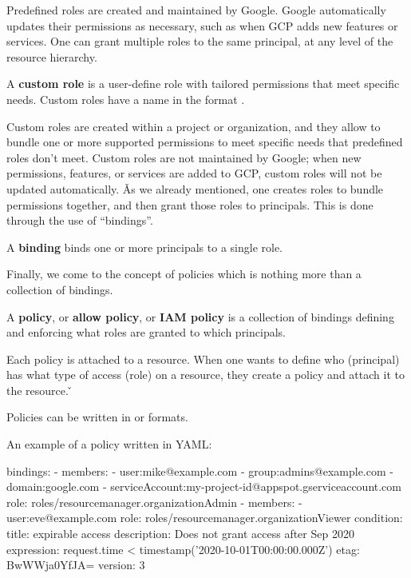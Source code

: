Predefined roles are created and maintained by Google. Google automatically updates their permissions as necessary,
such as when GCP adds new features or services. One can grant multiple roles to the same principal, at any level
of the resource hierarchy.

A \textbf{custom role} is a user-define role with tailored permissions that meet specific needs. Custom roles have a
name in the format .
\ed

Custom roles are created within a project or organization, and they allow to bundle one or more supported permissions
to meet specific needs that predefined roles don't meet. Custom roles are not maintained by Google; when new
permissions,
features, or services are added to GCP, custom roles will not be updated automatically. \v

As we already mentioned, one creates roles to bundle permissions together, and then grant those roles to principals.
This is done through the use of ``bindings''.

\bd[Binding]
A \textbf{binding} binds one or more principals to a single role.
\ed

Finally, we come to the concept of policies which is nothing more than a collection of bindings.

A \textbf{policy}, or \textbf{allow policy}, or \textbf{IAM policy} is a collection of bindings defining and enforcing
what roles are granted to which principals.
\ed

Each policy is attached to a resource. When one wants to define who (principal) has what type of access (role) on a
resource, they create a policy and attach it to the resource. \v


Policies can be written in  or  formats.

\be
An example of a policy written in YAML:
\begin{block}
bindings:
- members:
  - user:mike@example.com
  - group:admins@example.com
  - domain:google.com
  - serviceAccount:my-project-id@appspot.gserviceaccount.com
  role: roles/resourcemanager.organizationAdmin
- members:
  - user:eve@example.com
  role: roles/resourcemanager.organizationViewer
  condition:
    title: expirable access
    description: Does not grant access after Sep 2020
    expression: request.time < timestamp('2020-10-01T00:00:00.000Z')
etag: BwWWja0YfJA=
version: 3
\end{block}
\ee

